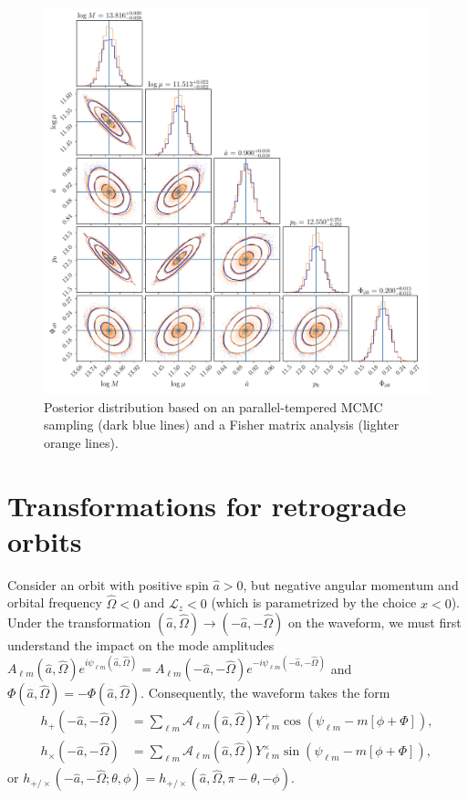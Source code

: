\documentclass[%
 reprint,
 nofootinbib,
 amsmath,amssymb,
 aps,
 prd,
]{revtex4-2}
\begin{document}
\begin{figure}[!htp]
    \centering
    \includegraphics[width=0.98\linewidth]{figures/mcmc.pdf}
    \caption{Posterior distribution based on an parallel-tempered MCMC sampling (dark blue lines) and a Fisher matrix analysis (lighter orange lines).}
    \label{fig:mcmcOverlay}
\end{figure}

\section{Transformations for retrograde orbits}
\label{app:retrograde}

Consider an orbit with positive spin $\hat{a} > 0$, but negative angular momentum and orbital frequency $\hat{\Omega} < 0$ and $\mathcal{L}_z < 0$ (which is parametrized by the choice $x<0$). Under the transformation $(\hat{a}, \hat{\Omega}) \rightarrow (-\hat{a}, -\hat{\Omega})$ on the waveform, we must first understand the impact on the mode amplitudes $A_{\ell m}(\hat{a},\hat{\Omega})e^{i\psi_{\ell m}(\hat{a},\hat{\Omega})} = A_{\ell m}(-\hat{a},-\hat{\Omega}) e^{-i\psi_{\ell m}(-\hat{a},-\hat{\Omega})}$ and $\Phi(\hat{a},\hat{\Omega}) = -\Phi(\hat{a},\hat{\Omega})$. Consequently, the waveform takes the form
\begin{subequations}
    \begin{align}
    h_+(-\hat{a},-\hat{\Omega}) &= \sum_{\ell m} \mathcal{A}_{\ell m}(\hat{a},\hat{\Omega}) Y^+_{\ell m} \cos(\psi_{\ell m} - m[\phi + \Phi]),
    \\
    h_\times(-\hat{a},-\hat{\Omega}) &= \sum_{\ell m} \mathcal{A}_{\ell m}(\hat{a},\hat{\Omega}) Y^\times_{\ell m} \sin(\psi_{\ell m} - m[\phi + \Phi]),
\end{align}
\end{subequations}
or $h_{+/\times}(-\hat{a},-\hat{\Omega}; \theta, \phi) = h_{+/\times}(\hat{a},\hat{\Omega}, \pi -\theta, -\phi)$.
\end{document}
